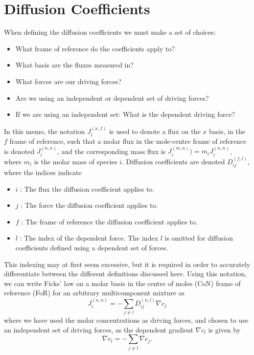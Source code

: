 \section{Diffusion Coefficients}\label{sec:diffusion}

When defining the diffusion coefficients we must make a set of choices:
\begin{itemize}
    \item What frame of reference do the coefficients apply to?
    \item What basis are the fluxes measured in?
    \item What forces are our driving forces?
    \item Are we using an independent or dependent set of driving forces?
    \item If we are using an independent set: What is the dependent driving force?
\end{itemize}

In this memo, the notation $J_i^{(x, f)}$ is used to denote a flux on the $x$ basis, in the $f$ frame of reference, such that a molar flux in the mole-centre frame of reference is denoted $J_i^{(n, n)}$, and the corresponding mass flux is $J_i^{(m, n)} ) = m_i J_i^{(n, n)}$, where $m_i$ is the molar mass of species $i$. Diffusion coefficients are denoted $D_{ij}^{(f,l)}$, where the indices indicate 

\begin{itemize}
    \item $i$ : The flux the diffusion coefficient applies to.
    \item $j$ : The force the diffusion coefficient applies to.
    \item $f$ : The frame of reference the diffusion coefficient applies to.
    \item $l$ : The index of the dependent force. The index $l$ is omitted for diffusion coefficients defined using a dependent set of forces.
\end{itemize}

This indexing may at first seem excessive, but it is required in order to accurately differentiate between the different definitions discussed here. Using this notation, we can write Ficks' law on a molar basis in the centre of moles (CoN) frame of reference (FoR) for an arbitrary multicomponent mixture as
\begin{equation}
    J_i^{(n,n)} = - \sum_{j \neq l} D_{ij}^{(n,l)} \nabla c_j
\end{equation}
where we have used the molar concentrations as driving forces, and chosen to use an independent set of driving forces, as the dependent gradient $\nabla c_l$ is given by
\begin{equation}
    \nabla c_l = - \sum_{j \neq l} \nabla c_j.
\end{equation}


